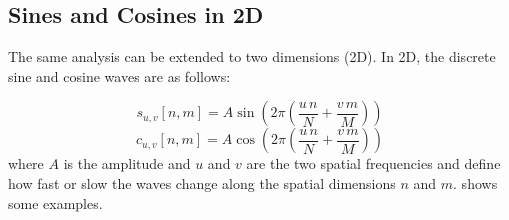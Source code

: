 \subsection{Sines and Cosines in 2D}

The same analysis can be extended to two dimensions (2D). In 2D, the discrete sine and cosine waves are as follows:

 \begin{equation}
 s_{u,v}\left[n,m\right] = A \sin \left(2 \pi \left( \frac{u\,n}{N}  + \frac{v\,m}{M}  \right) \right)
 \end{equation}
 \begin{equation}
 c_{u,v}\left[n,m\right] = A \cos \left(2 \pi \left( \frac{u\,n}{N}  + \frac{v\,m}{M}  \right) \right)
 \end{equation}
 where $A$ is the amplitude and $u$ and $v$ are the two spatial frequencies and define how fast or slow the waves change along the spatial dimensions $n$ and $m$. \Fig{\ref{fig:disc2Dsignal}} shows some examples. 
